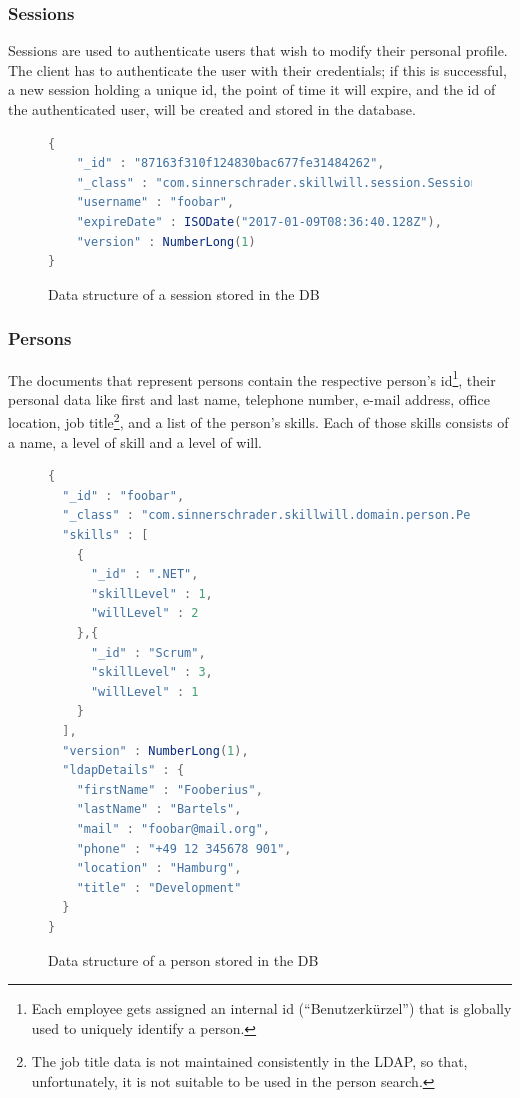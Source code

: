\subsubsection{Sessions}
Sessions are used to authenticate users that wish to modify their personal profile. The client has to authenticate the user with their credentials; if this is successful, a new session holding a unique id, the point of time it will expire, and the id of the authenticated user, will be created and stored in the database.

\begin{figure}[h]
\begin{lstlisting}[language=Java]
{
	"_id" : "87163f310f124830bac677fe31484262",
	"_class" : "com.sinnerschrader.skillwill.session.Session",
	"username" : "foobar",
	"expireDate" : ISODate("2017-01-09T08:36:40.128Z"),
	"version" : NumberLong(1)
}
\end{lstlisting}
\caption[Session (DB Data Structure)]{Data structure of a session stored in the DB}
\end{figure}
\newpage

\subsubsection{Persons}
\label{db:person}
The documents that represent persons contain the respective person's id\footnote{Each employee gets assigned an internal id (``Benutzerkürzel'') that is globally used to uniquely identify a person.}, their personal data like first and last name, telephone number, e-mail address, office location, job title\footnote{The job title data is not maintained consistently in the LDAP, so that, unfortunately, it is not suitable to be used in the person search.}, and a list of the person's skills. Each of those skills consists of a name, a level of skill and a level of will.
\begin{figure}[h]
\begin{lstlisting}[language=Java]
{
  "_id" : "foobar",
  "_class" : "com.sinnerschrader.skillwill.domain.person.Person",
  "skills" : [
    {
      "_id" : ".NET",
      "skillLevel" : 1,
      "willLevel" : 2
    },{
      "_id" : "Scrum",
      "skillLevel" : 3,
      "willLevel" : 1
    }
  ],
  "version" : NumberLong(1),
  "ldapDetails" : {
    "firstName" : "Fooberius",
    "lastName" : "Bartels",
    "mail" : "foobar@mail.org",
    "phone" : "+49 12 345678 901",
    "location" : "Hamburg",
    "title" : "Development"
  }
}
\end{lstlisting}
\caption[Person (DB Data Structure)]{Data structure of a person stored in the DB}
\end{figure}

